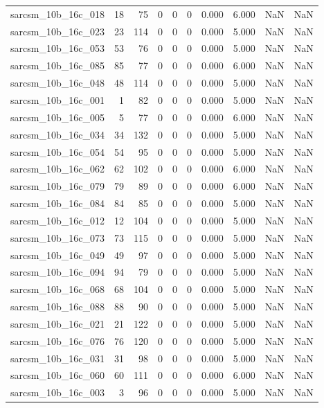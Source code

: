 \documentclass{article}
\begin{document}
\begin{longtable}{lrrrrrrrrr}
sarcsm\_10b\_16c\_018 & 18 & 75 & 0 & 0 & 0 & 0.000 & 6.000 & NaN & NaN \\
sarcsm\_10b\_16c\_023 & 23 & 114 & 0 & 0 & 0 & 0.000 & 5.000 & NaN & NaN \\
sarcsm\_10b\_16c\_053 & 53 & 76 & 0 & 0 & 0 & 0.000 & 5.000 & NaN & NaN \\
sarcsm\_10b\_16c\_085 & 85 & 77 & 0 & 0 & 0 & 0.000 & 6.000 & NaN & NaN \\
sarcsm\_10b\_16c\_048 & 48 & 114 & 0 & 0 & 0 & 0.000 & 5.000 & NaN & NaN \\
sarcsm\_10b\_16c\_001 & 1 & 82 & 0 & 0 & 0 & 0.000 & 5.000 & NaN & NaN \\
sarcsm\_10b\_16c\_005 & 5 & 77 & 0 & 0 & 0 & 0.000 & 6.000 & NaN & NaN \\
sarcsm\_10b\_16c\_034 & 34 & 132 & 0 & 0 & 0 & 0.000 & 5.000 & NaN & NaN \\
sarcsm\_10b\_16c\_054 & 54 & 95 & 0 & 0 & 0 & 0.000 & 5.000 & NaN & NaN \\
sarcsm\_10b\_16c\_062 & 62 & 102 & 0 & 0 & 0 & 0.000 & 6.000 & NaN & NaN \\
sarcsm\_10b\_16c\_079 & 79 & 89 & 0 & 0 & 0 & 0.000 & 6.000 & NaN & NaN \\
sarcsm\_10b\_16c\_084 & 84 & 85 & 0 & 0 & 0 & 0.000 & 5.000 & NaN & NaN \\
sarcsm\_10b\_16c\_012 & 12 & 104 & 0 & 0 & 0 & 0.000 & 5.000 & NaN & NaN \\
sarcsm\_10b\_16c\_073 & 73 & 115 & 0 & 0 & 0 & 0.000 & 5.000 & NaN & NaN \\
sarcsm\_10b\_16c\_049 & 49 & 97 & 0 & 0 & 0 & 0.000 & 5.000 & NaN & NaN \\
sarcsm\_10b\_16c\_094 & 94 & 79 & 0 & 0 & 0 & 0.000 & 5.000 & NaN & NaN \\
sarcsm\_10b\_16c\_068 & 68 & 104 & 0 & 0 & 0 & 0.000 & 5.000 & NaN & NaN \\
sarcsm\_10b\_16c\_088 & 88 & 90 & 0 & 0 & 0 & 0.000 & 5.000 & NaN & NaN \\
sarcsm\_10b\_16c\_021 & 21 & 122 & 0 & 0 & 0 & 0.000 & 5.000 & NaN & NaN \\
sarcsm\_10b\_16c\_076 & 76 & 120 & 0 & 0 & 0 & 0.000 & 5.000 & NaN & NaN \\
sarcsm\_10b\_16c\_031 & 31 & 98 & 0 & 0 & 0 & 0.000 & 5.000 & NaN & NaN \\
sarcsm\_10b\_16c\_060 & 60 & 111 & 0 & 0 & 0 & 0.000 & 6.000 & NaN & NaN \\
sarcsm\_10b\_16c\_003 & 3 & 96 & 0 & 0 & 0 & 0.000 & 5.000 & NaN & NaN \\

\end{longtable}
\end{document}
